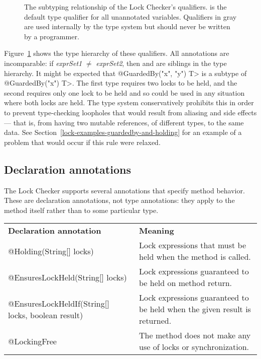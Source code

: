 \begin{figure}
\caption{The subtyping relationship of the Lock Checker's qualifiers.
 is the default type qualifier for all unannotated
variables.
Qualifiers in gray
are used internally by the type system but should never be written by a
programmer.}
\label{fig-lock-guardedby-hierarchy}
\end{figure}

Figure~\ref{fig-lock-guardedby-hierarchy} shows the type hierarchy of these
qualifiers.
All  annotations are incomparable:
if \emph{exprSet1} $\neq$ \emph{exprSet2}, then  and
 are siblings in the type hierarchy.
It might be expected that
\<@GuardedBy({"x", "y"}) T> is a subtype of \<@GuardedBy({"x"}) T>.  The
first type requires two locks to be held, and the second requires only one
lock to be held and so could be used in any situation where both locks are
held.  The type system conservatively prohibits this in order to prevent
type-checking loopholes that would result from aliasing and side effects
--- that is, from having two mutable references, of different types, to the
same data. See
Section~\ref{lock-examples-guardedby-and-holding} for an example
of a problem that would occur if this rule were relaxed.


\subsection{Declaration annotations\label{lock-declaration-annotations}}

The Lock Checker supports several annotations that specify method behavior.
These are declaration annotations, not type annotations: they apply to the
method itself rather than to some particular type.

\begin{tabular}{l|l|}
\textbf{Declaration annotation} & \textbf{Meaning} \\
@Holding(String[] locks) &
Lock expressions that must be held when the method is called.
\\
@EnsuresLockHeld(String[] locks) &
Lock expressions guaranteed to be held on method return.
\\
@EnsuresLockHeldIf(String[] locks, boolean result) &
Lock expressions guaranteed to be held when the given result is returned.
\\
@LockingFree &
The method does not make any use of locks or synchronization.
\\
\end{tabular}


